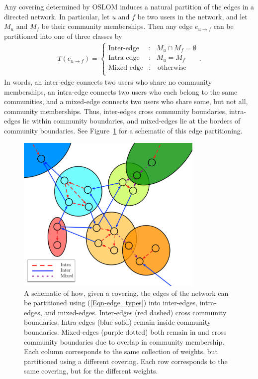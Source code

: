 Any covering determined by OSLOM induces a natural partition of the edges in a directed network. In particular, let $u$ and $f$ be two users in the network, and let $M_{u}$ and $M_{f}$ be their community memberships. Then any edge $e_{u \to f}$ can be partitioned into one of three classes by
\begin{align}
	T(e_{u \to f}) = \left\{ \begin{array}{ll}
		\text{Inter-edge} &: \ \ \ M_{u} \cap M_{f} = \emptyset \\
		\text{Intra-edge} &: \ \ \ M_{u} = M_{f}\\
		\text{Mixed-edge} &: \ \ \ \text{ otherwise} \\
	\end{array}\right. \label{Eqn-edge_types}.
\end{align}
In words, an inter-edge connects two users who share no community memberships, an intra-edge connects two users who each belong to the same communities, and a mixed-edge connects two users who share some, but not all, community memberships. Thus, inter-edges cross community boundaries, intra-edges lie within community boundaries, and mixed-edges lie at the borders of community boundaries. See Figure~\ref{Fig-edge_types} for a schematic of this edge partitioning.

\begin{figure}[!h]
	\centering
	\includegraphics[width=0.8\textwidth]{edge-types}
	\caption{A schematic of how, given a covering, the edges of the network can be partitioned using (\ref{Eqn-edge_types}) into inter-edges, intra-edges, and mixed-edges. Inter-edges (red dashed) cross community boundaries. Intra-edges (blue solid) remain inside community boundaries. Mixed-edges (purple dotted) both remain in and cross community boundaries due to overlap in community membership. Each column corresponds to the same collection of weights, but partitioned using a different covering. Each row corresponds to the same covering, but for the different weights.}
	\label{Fig-edge_types}
\end{figure}

